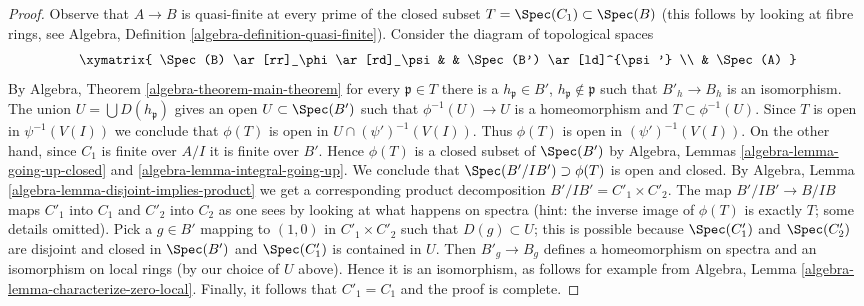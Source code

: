 \begin{proof}
Observe that $A \to B$ is quasi-finite at every prime of the
closed subset $T = \Spec(C_1) \subset \Spec(B)$ (this follows
by looking at fibre rings, see
Algebra, Definition \ref{algebra-definition-quasi-finite}).
Consider the diagram of topological spaces
$$
\xymatrix{
\Spec(B) \ar[rr]_\phi \ar[rd]_\psi & & \Spec(B') \ar[ld]^{\psi'} \\
& \Spec(A)
}
$$
By Algebra, Theorem \ref{algebra-theorem-main-theorem}
for every $\mathfrak p \in T$ there is a $h_\mathfrak p \in B'$,
$h_\mathfrak p \not \in \mathfrak p$ such that $B'_h \to B_h$ is
an isomorphism. The union $U = \bigcup D(h_\mathfrak p)$ gives an open
$U \subset \Spec(B')$ such that $\phi^{-1}(U) \to U$ is a homeomorphism
and $T \subset \phi^{-1}(U)$. Since $T$ is open in $\psi^{-1}(V(I))$
we conclude that $\phi(T)$ is open in $U \cap (\psi')^{-1}(V(I))$.
Thus $\phi(T)$ is open in $(\psi')^{-1}(V(I))$.
On the other hand, since $C_1$ is finite over $A/I$ it is
finite over $B'$. Hence $\phi(T)$ is a closed subset of $\Spec(B')$
by Algebra, Lemmas \ref{algebra-lemma-going-up-closed} and
\ref{algebra-lemma-integral-going-up}. We conclude that
$\Spec(B'/IB') \supset \phi(T)$ is open and closed. By
Algebra, Lemma \ref{algebra-lemma-disjoint-implies-product}
we get a corresponding product decomposition $B'/IB' = C'_1 \times C'_2$.
The map $B'/IB' \to B/IB$ maps $C'_1$ into $C_1$ and $C'_2$ into $C_2$
as one sees by looking at what happens on spectra (hint: the inverse
image of $\phi(T)$ is exactly $T$; some details omitted).
Pick a $g \in B'$ mapping to $(1, 0)$ in $C'_1 \times C'_2$
such that $D(g) \subset U$; this is possible because $\Spec(C'_1)$
and $\Spec(C'_2)$ are disjoint and closed in $\Spec(B')$ and
$\Spec(C'_1)$ is contained in $U$. Then $B'_g \to B_g$ defines a homeomorphism
on spectra and an isomorphism on local rings (by our choice of $U$ above).
Hence it is an isomorphism, as follows for example from
Algebra, Lemma \ref{algebra-lemma-characterize-zero-local}.
Finally, it follows that $C'_1 = C_1$ and the proof is complete.
\end{proof}

